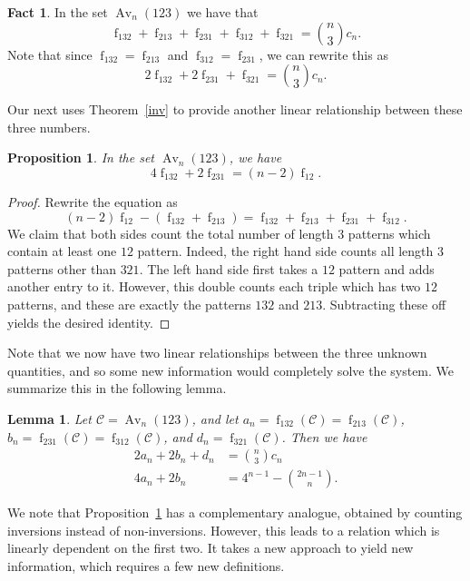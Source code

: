 \documentclass[11pt]{article} %
\theoremstyle{plain}
\newtheorem{lemma}[theorem]{Lemma}
\newtheorem{proposition}[theorem]{Proposition}
\theoremstyle{definition}
\newtheorem{fact}[theorem]{Fact}
\newcommand{\C}{\mathcal{C}}
\newcommand{\Avn}{\Av_n(123)}
\DeclareMathOperator{\Av}{Av}
\DeclareMathOperator{\num}{f}
\begin{document}
  \begin{fact} \label{relation1}
    In the set $\Avn$ we have that
    $$ \num_{132} + \num_{213} + \num_{231} +
    \num_{312} + \num_{321} = \binom{n}{3} c_n.$$
    Note that since $\num_{132} = \num_{213}$ and
    $\num_{312} = \num_{231}$, we can rewrite this as
    $$ 2 \num_{132} + 2 \num_{231} + \num_{321} =
        \binom{n}{3}c_n.$$
  \end{fact}

  Our next uses Theorem~\ref{inv} to provide another linear
  relationship between these three numbers.

  \begin{proposition} \label{relation2}
    In the set $\Avn$, we have
    $$ 4 \num_{132} + 2 \num_{231} = (n-2)\num_{12}.$$
  \end{proposition}
  \begin{proof}
    Rewrite the equation as
    $$(n-2)\num_{12} - (\num_{132} + \num_{213}) =
    \num_{132}+\num_{213}+\num_{231}+\num_{312} .$$
    We claim that both sides count the total number of length $3$
    patterns which contain at least one $12$ pattern. Indeed, the
    right hand side counts all length $3$ patterns other than $321$.
    The left hand side first takes a $12$ pattern and adds another
    entry to it. However, this double counts each triple which
    has two $12$ patterns, and these are exactly the patterns $132$
    and $213$. Subtracting these off yields the desired identity.
  \end{proof}

  Note that we now have two linear relationships between the three
  unknown quantities, and so some new information would completely
  solve the system. We summarize this in the following lemma.

  \begin{lemma}\label{linsys}
    Let $\C = \Avn$, and let $a_n = \num_{132}(\C) = \num_{213}(\C)$,
    $b_n = \num_{231}(\C) = \num_{312}(\C)$, and $d_n =
    \num_{321}(\C)$.
    Then we have
    $$ \begin{array}{ll}
      2a_n + 2b_n + d_n & = \binom{n}{3} c_n \\
      4a_n + 2b_n     & = 4^{n-1} - \binom{2n-1}{n}.
        \end{array}
    $$
  \end{lemma}

  We note that Proposition~\ref{relation2} has a
  complementary analogue, obtained by counting inversions instead of
  non-inversions. However, this leads to a relation which is linearly
  dependent on the first two. It takes a new approach to yield new
  information, which requires a few new definitions.
\end{document}
